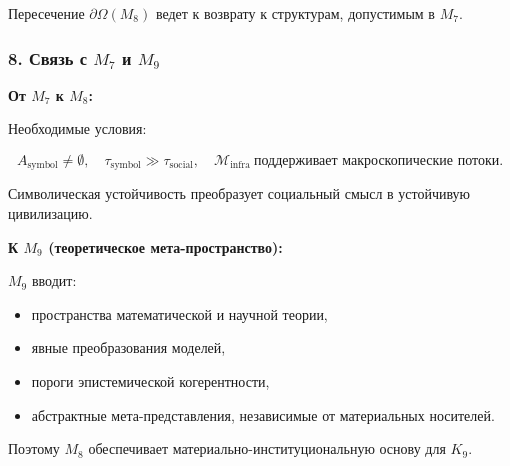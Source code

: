 Пересечение $\partial\Omega(M_8)$ ведет к возврату к структурам, допустимым в $M_7$.

\subsubsection*{8. Связь с \texorpdfstring{$M_7$}{M_7} и \texorpdfstring{$M_9$}{M_9}}

\textbf{От $M_7$ к $M_8$:}

Необходимые условия:

\[
A_{\mathrm{symbol}} \neq \emptyset,
\quad
\tau_{\mathrm{symbol}} \gg \tau_{\mathrm{social}},
\quad
\mathcal{M}_{\mathrm{infra}}\ \text{поддерживает макроскопические потоки}.
\]

Символическая устойчивость преобразует социальный смысл в устойчивую цивилизацию.

\textbf{К $M_9$ (теоретическое мета-пространство):}

$M_9$ вводит:

\begin{itemize}
    \item пространства математической и научной теории,
    \item явные преобразования моделей,
    \item пороги эпистемической когерентности,
    \item абстрактные мета-представления, независимые от материальных носителей.
\end{itemize}

Поэтому $M_8$ обеспечивает материально-институциональную основу для $K_9$.
